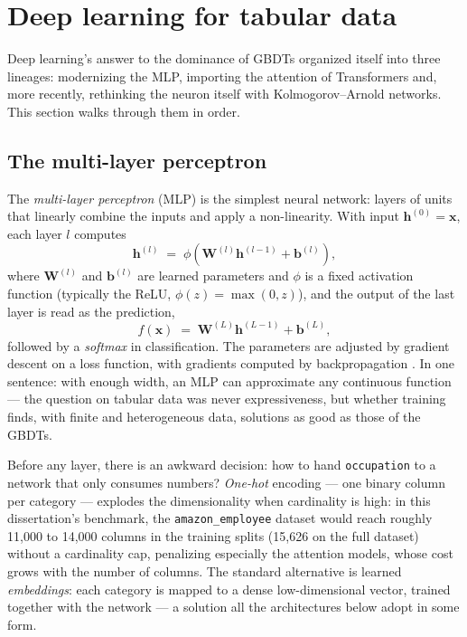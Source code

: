 \section{Deep learning for tabular data}
\label{sec:fund-dl}

Deep learning's answer to the dominance of GBDTs organized itself
into three lineages: modernizing the MLP, importing the attention of
Transformers and, more recently, rethinking the neuron itself with
Kolmogorov--Arnold networks. This section walks through them in
order.

\subsection{The multi-layer perceptron}

The \emph{multi-layer perceptron} (MLP) is the simplest neural
network: layers of units that linearly combine the inputs and apply
a non-linearity. With input $\mathbf{h}^{(0)} = \mathbf{x}$, each
layer $l$ computes
\begin{equation}
  \mathbf{h}^{(l)} \;=\; \phi\!\left(\mathbf{W}^{(l)} \mathbf{h}^{(l-1)}
  + \mathbf{b}^{(l)}\right),
  \label{eq:mlp-camada}
\end{equation}
where $\mathbf{W}^{(l)}$ and $\mathbf{b}^{(l)}$ are learned
parameters and $\phi$ is a fixed activation function (typically the
ReLU, $\phi(z) = \max(0, z)$), and the output of the last layer is
read as the prediction,
\begin{equation}
  f(\mathbf{x}) \;=\; \mathbf{W}^{(L)} \mathbf{h}^{(L-1)} + \mathbf{b}^{(L)},
  \label{eq:mlp-saida}
\end{equation}
followed by a \emph{softmax} in classification. The parameters are
adjusted by gradient descent on a loss function, with gradients
computed by backpropagation \citep{rumelhart1986}. In one sentence:
with enough width, an MLP can approximate any continuous function
\citep{hornik1989} --- the question on tabular data was never
expressiveness, but whether training finds, with finite and
heterogeneous data, solutions as good as those of the GBDTs.

Before any layer, there is an awkward decision: how to hand
\texttt{occupation} to a network that only consumes numbers?
\emph{One-hot} encoding --- one binary column per category ---
explodes the dimensionality when cardinality is high: in this
dissertation's benchmark, the \texttt{amazon\_\allowbreak employee}
dataset would reach roughly 11{,}000 to 14{,}000 columns in the
training splits (15{,}626 on the full dataset) without a cardinality
cap, penalizing
especially the attention models, whose cost grows with the number of
columns. The standard alternative is learned \emph{embeddings}: each
category is mapped to a dense low-dimensional vector, trained
together with the network --- a solution all the architectures below
adopt in some form.

